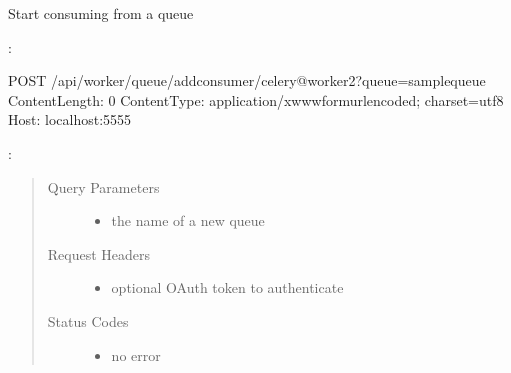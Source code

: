 \documentclass[letterpaper,10pt,english]{sphinxmanual}
\begin{document}
\begin{fulllineitems}
\label{\detokenize{api:post--api-worker-queue-add-consumer-(.+)}}
Start consuming from a queue

:

\begin{sphinxVerbatim}[commandchars=\\\{\}]
POST /api/worker/queue/add\PYGZhy{}consumer/celery@worker2?queue=sample\PYGZhy{}queue
Content\PYGZhy{}Length: 0
Content\PYGZhy{}Type: application/x\PYGZhy{}www\PYGZhy{}form\PYGZhy{}urlencoded; charset=utf\PYGZhy{}8
Host: localhost:5555
\end{sphinxVerbatim}

:

\begin{sphinxVerbatim}[commandchars=\\\{\}]
  
 
 

     
\end{sphinxVerbatim}
\begin{quote}\begin{description}
\item[{Query Parameters}] \leavevmode\begin{itemize}
\item {} 
 \textendash{} the name of a new queue

\end{itemize}

\item[{Request Headers}] \leavevmode\begin{itemize}
\item {} 
 \textendash{} optional OAuth token to authenticate

\end{itemize}

\item[{Status Codes}] \leavevmode\begin{itemize}
\item {} 
 \textendash{} no error


\end{itemize}
\end{description}
\end{quote}
\end{fulllineitems}
\end{document}
